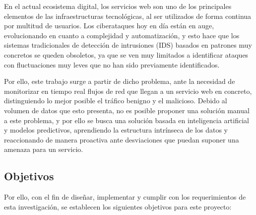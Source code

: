\documentclass[12pt]{article}
\numberwithin{equation}{section} %
\begin{document}
    \vspace{5mm}
    
    En el actual ecosistema digital, los servicios web son uno de los principales elementos de las infraestructuras tecnológicas, al ser utilizados de forma continua por multitud de usuarios. Los ciberataques hoy en día están en auge, evolucionando en cuanto a complejidad y automatización, y esto hace que los sistemas tradicionales de detección de intrusiones (IDS) basados en patrones muy concretos se queden obsoletos, ya que se ven muy limitados a identificar ataques con fluctuaciones muy leves que no han sido previamente identificados.

    \vspace{5mm}

    Por ello, este trabajo surge a partir de dicho problema, ante la necesidad de monitorizar en tiempo real flujos de red que llegan a un servicio web en concreto, distinguiendo lo mejor posible el tráfico benigno y el malicioso. Debido al volumen de datos que esto presenta, no es posible proponer una solución manual a este problema, y por ello se busca una solución basada en inteligencia artificial y modelos predictivos, aprendiendo la estructura intrínseca de los datos y reaccionando de manera proactiva ante desviaciones que puedan suponer una amenaza para un servicio.

    \vspace{5mm}

    \subsection{Objetivos}

    \vspace{5mm}

    Por ello, con el fin de diseñar, implementar y cumplir con los requerimientos de esta investigación, se establecen los siguientes objetivos para este proyecto:

    \vspace{5mm}
\end{document}
